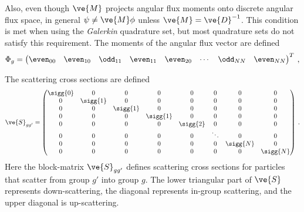 \documentclass{article}
\numberwithin{equation}{subsection}
\begin{document}
Also, even though $\ve{M}$ projects angular flux moments onto discrete angular
flux space, in general $\psi\ne\ve{M}\phi$ unless $\ve{M} = \ve{D}^{-1}$.
This condition is met when using the \textit{Galerkin} quadrature set, but
most quadrature sets do not satisfy this requirement. The moments of the
angular flux vector are defined
\begin{equation}
  \Phi_g = \begin{pmatrix}
    \even_{00} & \even_{10} & \odd_{11} & \even_{11} & \even_{20}
    & \cdots & \odd_{NN} & \even_{NN}
  \end{pmatrix}^T\:,
\end{equation}

The scattering cross sections are defined
\begin{equation}
  \ve{S}_{gg'} = \begin{pmatrix}
    \sigg{0} & 0 & 0 & 0 & 0 & 0 & 0 & 0 \\
    0 & \sigg{1} & 0 & 0 & 0 & 0 & 0 & 0 \\
    0 & 0 & \sigg{1} & 0 & 0 & 0 & 0 & 0 \\
    0 & 0 & 0 & \sigg{1} & 0 & 0 & 0 & 0 \\
    0 & 0 & 0 & 0 & \sigg{2} & 0 & 0 & 0 \\
    0 & 0 & 0 & 0 & 0 & \ddots   & 0 & 0 \\
    0 & 0 & 0 & 0 & 0 & 0 & \sigg{N} & 0 \\
    0 & 0 & 0 & 0 & 0 & 0 & 0 & \sigg{N}
  \end{pmatrix}\:.
\end{equation}
Here the block-matrix $\ve{S}_{gg'}$ defines scattering cross sections for
particles that scatter from group $g'$ into group $g$.  The lower triangular
part of $\ve{S}$ represents down-scattering, the diagonal represents in-group
scattering, and the upper diagonal is up-scattering.


\end{document}
